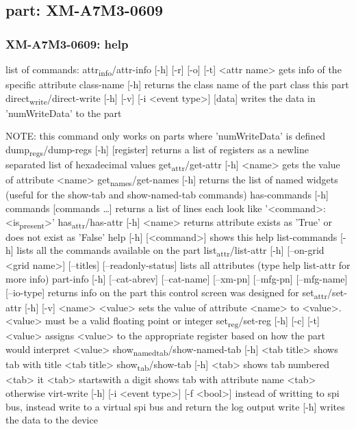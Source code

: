 \documentclass[11pt]{article}
\begin{document}
\subsection{part: XM-A7M3-0609}
\label{sec:org9f3b6bb}
\subsubsection{XM-A7M3-0609: help}
\label{sec:org7d248aa}
list of commands:
  attr\textsubscript{info}/attr-info [-h] [-r] [-o] [-t] <attr name>
    gets info of the specific attribute
  class-name [-h]
    returns the class name of the part class this part
  direct\textsubscript{write}/direct-write [-h] [-v] [-i <event type>] [data]
    writes the data in 'numWriteData' to the part

  NOTE: this command only works on parts where 'numWriteData' is defined
dump\textsubscript{regs}/dump-regs [-h] [register]
  returns a list of registers as a newline separated list of hexadecimal values
get\textsubscript{attr}/get-attr [-h] <name>
  gets the value of attribute <name>
get\textsubscript{names}/get-names [-h]
  returns the list of named widgets (useful for the show-tab and show-named-tab commands)
has-commands [-h] commands [commands \ldots{}]
  returns a list of lines each look like '<command>: <is\textsubscript{present}>'
has\textsubscript{attr}/has-attr [-h] <name>
  returns attribute exists as 'True' or does not exist as 'False'
help [-h] [<command>]
  shows this help
list-commands [-h]
  lists all the commands available on the part
list\textsubscript{attr}/list-attr [-h] [--on-grid <grid name>] [--titles] [--readonly-status]
  lists all attributes (type help list-attr for more info)
part-info  [-h] [--cat-abrev] [--cat-name] [--xm-pn] [--mfg-pn] [--mfg-name]
	[--io-type]
  returns info on the part this control screen was designed for
set\textsubscript{attr}/set-attr [-h] [-v] <name> <value>
  sets the value of attribute <name> to <value>.
  <value> must be a valid floating point or integer
set\textsubscript{reg}/set-reg [-h] [-c] [-t] <value>
  assigns <value> to the appropriate register based on how the part would interpret <value>
show\textsubscript{named}\textsubscript{tab}/show-named-tab [-h] <tab title>
  shows tab with title <tab title>
show\textsubscript{tab}/show-tab [-h] <tab>
  shows tab numbered <tab> it <tab> startswith a digit
  shows tab with attribute name <tab> otherwise
virt-write [-h] [-i <event type>] [-f <bool>]
  instead of writting to spi bus, instead write to a virtual spi bus
  and return the log output
write [-h]
  writes the data to the device
\end{document}
